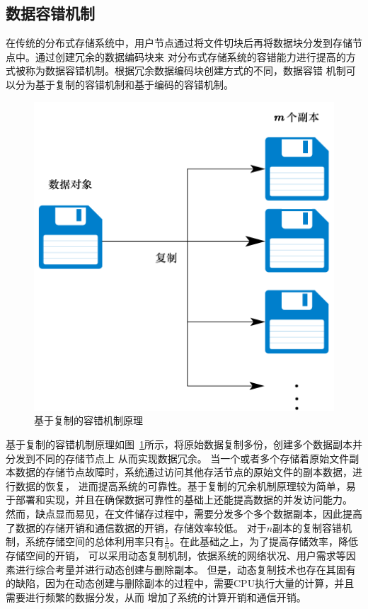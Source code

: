 \subsection{数据容错机制}
在传统的分布式存储系统中，用户节点通过将文件切块后再将数据块分发到存储节点中。通过创建冗余的数据编码块来
对分布式存储系统的容错能力进行提高的方式被称为数据容错机制。根据冗余数据编码块创建方式的不同，数据容错
机制可以分为基于复制的容错机制和基于编码的容错机制。
\begin{figure}[htbp]
	\centering
	\includegraphics [scale=0.5]{figures/1.1.pdf}
	\caption{基于复制的容错机制原理}
	\label{fig:con-1.1}
\end{figure}

基于复制的容错机制原理如图~\ref{fig:con-1.1}所示，将原始数据复制多份，创建多个数据副本并分发到不同的存储节点上
从而实现数据冗余\cite{shvachko2010hadoop,ghemawat2003google,王意洁2017分布式存储中的纠删码容错技术研究}。
当一个或者多个存储着原始文件副本数据的存储节点故障时，系统通过访问其他存活节点的原始文件的副本数据，进行数据的恢复，
进而提高系统的可靠性。基于复制的冗余机制原理较为简单，易于部署和实现，并且在确保数据可靠性的基础上还能提高数据的并发访问能力。
然而，缺点显而易见，在文件储存过程中，需要分发多个多个数据副本，因此提高了数据的存储开销和通信数据的开销，存储效率较低。
对于$n$副本的复制容错机制，系统存储空间的总体利用率只有$\frac{1}{n}$。在此基础之上，为了提高存储效率，降低存储空间的开销，
可以采用动态复制机制，依据系统的网络状况、用户需求等因素进行综合考量并进行动态创建与删除副本\cite{lakshman2010cassandra,gill2016dynamic,gai2012design}。
但是，动态复制技术也存在其固有的缺陷，因为在动态创建与删除副本的过程中，需要CPU执行大量的计算，并且需要进行频繁的数据分发，从而
增加了系统的计算开销和通信开销。


